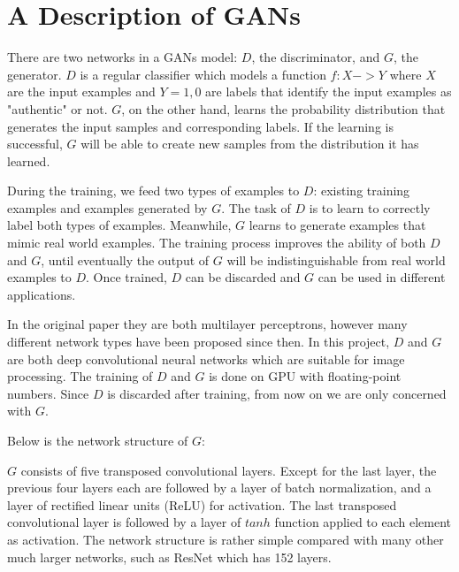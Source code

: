 
\chapter{A Description of GANs}

There are two networks in a GANs model: $D$, the discriminator, and $G$, the generator. $D$ is a regular
classifier which models a function $f: X -> Y$ where $X$ are the input examples and $Y = {1, 0}$ are labels
that identify the input examples as "authentic" or not. $G$, on the other hand, learns the probability
distribution that generates the input samples and corresponding labels. If the learning is successful,
$G$ will be able to create new samples from the distribution it has learned.

During the training, we feed two types of examples to $D$: existing training examples and examples generated
by $G$. The task of $D$ is to learn to correctly label both types of examples. Meanwhile, $G$ learns to
generate examples that mimic real world examples. The training process improves the ability of both $D$
and $G$, until eventually the output of $G$ will be indistinguishable from real world examples to $D$. Once
trained, $D$ can be discarded and $G$ can be used in different applications.

In the original paper they are both multilayer perceptrons, however many different network types have been
proposed since then. In this project, $D$ and $G$ are both deep convolutional neural networks which are
suitable for image processing. The training of $D$ and $G$ is done on GPU with floating-point numbers. Since
$D$ is discarded after training, from now on we are only concerned with $G$.

Below is the network structure of $G$:

$G$ consists of five transposed convolutional layers. Except for the last layer, the previous four layers
each are followed by a layer of batch normalization, and a layer of rectified linear units (ReLU) for
activation. The last transposed convolutional layer is followed by a layer of $tanh$ function applied to
each element as activation. The network structure is rather simple compared with many other much larger
networks, such as ResNet which has 152 layers.

\clearpage %
